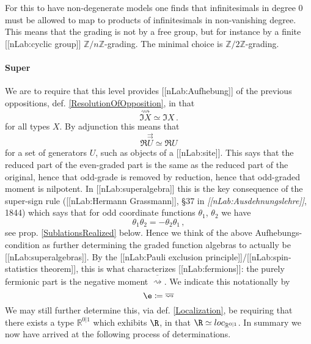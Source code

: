 \documentclass[12pt,titlepage]{article}
\theoremstyle{plain}
\theoremstyle{definition}
\theoremstyle{remark}
\begin{document}
For this to have non-degenerate models one finds that infinitesimals in degree 0 must be allowed to map to products of infinitesimals in non-vanishing degree. This means that the grading is not by a free group, but for instance by a finite [[nLab:cyclic group]] $\mathbb{Z}/n\mathbb{Z}$-grading. The minimal choice is $\mathbb{Z}/2\mathbb{Z}$-grading.
\hypertarget{FormalizationSuperGrading}{}\paragraph*{{Super}}\label{FormalizationSuperGrading}
We are to require that this level provides [[nLab:Aufhebung]] of the previous oppositions, def. \ref{ResolutionOfOpposition}, in that
\begin{displaymath}
\stackrel{\rightsquigarrow}{\Im X} \simeq \Im X
  \,.
\end{displaymath}
for all types $X$. By adjunction this means that
\begin{displaymath}
\Re \stackrel{\rightrightarrows}{U} \simeq \Re U
\end{displaymath}
for a set of generators $U$, such as objects of a [[nLab:site]].
This says that the reduced part of the even-graded part is the same as the reduced part of the original, hence that odd-grade is removed by reduction, hence that odd-graded moment is nilpotent. In [[nLab:superalgebra]] this is the key consequence of the super-sign rule ([[nLab:Hermann Grassmann]], §37 in \emph{[[nLab:Ausdehnungslehre]]}, 1844) which says that for odd coordinate functions $\theta_1$, $\theta_2$ we have
\begin{displaymath}
\theta_1 \theta_2 = -\theta_2 \theta_1
  \,,
\end{displaymath}
see prop. \ref{SublationsRealized} below.
Hence we think of the above Aufhebungs-condition as further determining the graded function algebras to actually be [[nLab:superalgebras]].
By the [[nLab:Pauli exclusion principle]]/[[nLab:spin-statistics theorem]], this is what characterizes [[nLab:fermions]]: the purely fermionic part is the negative moment $\overline{\rightsquigarrow}$.
We indicate this notationally by
\begin{displaymath}
\e \coloneqq \overline{\rightsquigarrow}
\end{displaymath}
We may still further determine this, via def. \ref{Localization}, be requiring that there exists a type $\mathbb{R}^{0|1}$ which exhibits $\R$, in that $\R \simeq loc_{\mathbb{R}^{0|1}}$.
In summary we now have arrived at the following process of determinations.
\end{document}
